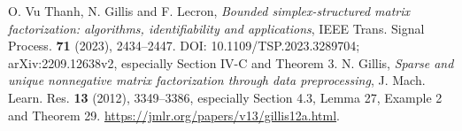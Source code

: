  O. Vu Thanh, N. Gillis and F. Lecron,
\emph{Bounded simplex-structured matrix factorization: algorithms,
identifiability and applications}, IEEE Trans. Signal Process.
\textbf{71} (2023), 2434--2447.
DOI: 10.1109/TSP.2023.3289704; arXiv:2209.12638v2,
especially Section IV-C and Theorem 3.
 N. Gillis,
\emph{Sparse and unique nonnegative matrix factorization through data
preprocessing}, J. Mach. Learn. Res. \textbf{13} (2012), 3349--3386,
especially Section 4.3, Lemma 27, Example 2 and Theorem 29.
\url{https://jmlr.org/papers/v13/gillis12a.html}.
